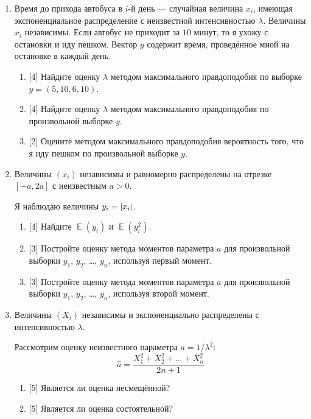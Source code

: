 \documentclass[12pt]{article}
\DeclarePairedDelimiter{\abs}{\lvert}{\rvert}
\DeclareMathOperator{\E}{\mathbb{E}}
\begin{document}
\begin{enumerate}
    \item Время до прихода автобуса в $i$-й день — случайная величина $x_i$, имеющая экспоненциальное распределение с неизвестной интенсивностью $\lambda$. 
    Величины $x_i$ независимы. 
    Если автобус не приходит за $10$ минут, то я ухожу с остановки и иду пешком. 
    Вектор $y$ содержит время, проведённое мной на остановке в каждый день.
    
    \begin{enumerate}
      \item {[4]} Найдите оценку $\lambda$ методом максимального правдоподобия по выборке $y = (5, 10, 6, 10)$.
      \item {[4]} Найдите оценку $\lambda$ методом максимального правдоподобия по 
      произвольной выборке $y$. 
      \item {[2]} Оцените методом максимального правдоподобия вероятность того, что я иду пешком по произвольной выборке $y$.
    \end{enumerate}
    
    
    \item Величины $(x_i)$ независимы и равномерно распределены на отрезке $[-a, 2a]$ с неизвестным $a > 0$.
    
    Я наблюдаю величины $y_i = \abs{x_i}$.

    \begin{enumerate}
        \item {[4]} Найдите $\E(y_i)$ и $\E(y_i^2)$.
        \item {[3]} Постройте оценку метода моментов параметра $a$ для произвольной выборки $y_1$, $y_2$, \dots, $y_n$, 
используя первый момент. 
\item {[3]} Постройте оценку метода моментов параметра $a$ для произвольной выборки $y_1$, $y_2$, \dots, $y_n$, 
используя второй момент. 
    \end{enumerate}

    \item Величины $(X_i)$ независимы и экспоненциально распределены с интенсивностью $\lambda$.
    
    Рассмотрим оценку неизвестного параметра $a = 1/\lambda^2$:
    \[
 \hat a = \frac{X_1^2 + X_2^2 + \dots + X_n^2}{2n + 1}
    \]

    \begin{enumerate}
        \item {[5]} Является ли оценка несмещённой?
        \item {[5]} Является ли оценка состоятельной?
    \end{enumerate}


\end{enumerate}
\end{document}
